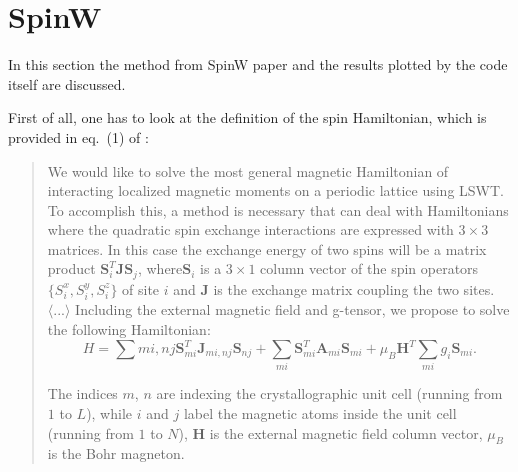 \documentclass[a4paper,12pt]{article}
\begin{document}
    \section{SpinW}
        In this section the method from SpinW paper \cite{toth2015linear} and the results plotted by the code \cite{SpinW} itself are discussed.

        First of all, one has to look at the definition of the spin Hamiltonian, which is provided in eq.~(1) of \cite{toth2015linear}:
        \begin{quote}
            We would like to solve the most general magnetic Hamiltonian
            of interacting localized magnetic moments on a periodic lattice
            using LSWT. To accomplish this, a method is necessary that
            can deal with Hamiltonians where the quadratic spin exchange
            interactions are expressed with $3 \times 3$ matrices. In this case
            the exchange energy of two spins will be a matrix product
            $\mathbf{S}_i^T\mathbf{J}\mathbf{S}_j$, where$\mathbf{S}_i$ is a $3 \times 1$ column vector of the spin operators
            $\{S_i^x, S_i^y, S_i^z\}$ of site $i$ and $\mathbf{J}$ is the exchange matrix coupling
            the two sites. $\langle ... \rangle$ Including the external magnetic field and g-tensor, we
            propose to solve the following Hamiltonian:
            \begin{equation}
                H = \sum{mi,nj} \mathbf{S}_{mi}^T \mathbf{J}_{mi,nj}\mathbf{S}_{nj} 
                + \sum_{mi} \mathbf{S}_{mi}^T \mathbf{A}_{mi}\mathbf{S}_{mi} + \mu_B\mathbf{H}^T\sum_{mi}g_i\mathbf{S}_{mi}.
                \tag{(1)}
            \end{equation}
            
            The indices $m$, $n$ are indexing the crystallographic unit cell
            (running from $1$ to $L$), while $i$ and $j$ label the magnetic atoms inside the unit cell (running from $1$ to $N$), $\mathbf{H}$ is the external
            magnetic field column vector, $\mu_B$ is the Bohr magneton.
        \end{quote}
\end{document}
